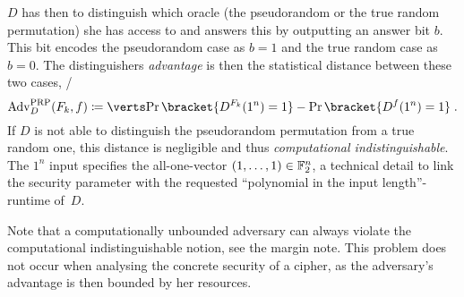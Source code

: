 $D$ has then to distinguish which oracle (the pseudorandom or the true random permutation) she has access to and answers this by outputting an answer bit $b$.
This bit encodes the pseudorandom case as $b=1$ and the true random case as $b=0$.
The distinguishers \emph{advantage} is then the statistical distance between these two cases, \ie/
\begin{equation*}
    \mathrm{Adv}_D^\mathrm{PRP}(F_k, f) \coloneqq \abs{\Prob\bracket{D^{F_k}(1^n) = 1} - \Prob\bracket{D^{f}(1^n) = 1}}\;.
\end{equation*}
If $D$ is not able to distinguish the pseudorandom permutation from a true random one, this distance is negligible and thus \emph{computational indistinguishable}.
The $1^n$ input specifies the all-one-vector $(1, \ldots, 1) \in \mathbb{F}_2^n$, a technical detail to link the security parameter with the requested \enquote{polynomial in the input length}-runtime of~$D$.

Note that a computationally unbounded adversary can always violate the computational indistinguishable notion, see the margin note.
This problem does not occur when analysing the concrete security of a cipher, as the adversary's advantage is then bounded by her resources.

